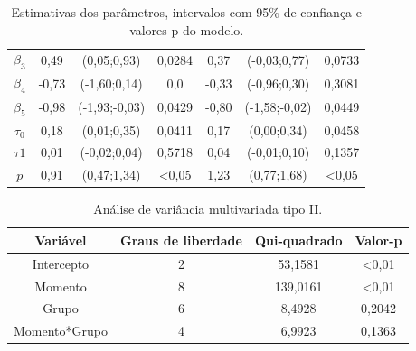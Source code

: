 \documentclass[AMA,STIX1COL]{WileyNJD-v2}
\begin{document}
\begin{table}[H]
\begin{tabular}{c|cccccc}
$\beta_3$                  & 0,49       & (0,05;0,93)                                                       & \multicolumn{1}{c|}{0,0284} & 0,37       & (-0,03;0,77)                                                      & 0,0733           \\
$\beta_4$                  & -0,73      & (-1,60;0,14)                                                      & \multicolumn{1}{c|}{0,0}            & -0,33      & (-0,96;0,30)                                                      & 0,3081           \\
$\beta_5$                  & -0,98      & (-1,93;-0,03)                                                     & \multicolumn{1}{c|}{0,0429} & -0,80      & (-1,58;-0,02)                                                     & 0,0449 \\
$\tau_0$                   & 0,18       & (0,01;0,35)                                                       & \multicolumn{1}{c|}{0,0411} & 0,17       & (0,00;0,34)                                                       & 0,0458           \\
$\tau1$                    & 0,01       & (-0,02;0,04)                                                      & \multicolumn{1}{c|}{0,5718}           & 0,04       & (-0,01;0,10)                                                      & 0,1357           \\
$p$                        & 0,91       & (0,47;1,34)                                                       & \multicolumn{1}{c|}{\textless 0,05} & 1,23       & (0,77;1,68)                                                       & \textless 0,05 \\ \hline
\end{tabular}
\caption{Estimativas dos parâmetros, intervalos com 95\% de confiança e valores-p do modelo.}
\label{tab3}
\end{table}

\begin{table}[H]
\centering
\begin{tabular}{cccc}
\hline
Variável      & Graus de liberdade & Qui-quadrado & Valor-p        \\ \hline
Intercepto    & 2                  & 53,1581      & \textless 0,01 \\
Momento       & 8                  & 139,0161     & \textless 0,01 \\
Grupo         & 6                  & 8,4928       & 0,2042         \\
Momento*Grupo & 4                  & 6,9923       & 0,1363         \\ \hline
\end{tabular}
\caption{Análise de variância multivariada tipo II.}
\label{tab4}
\end{table}
\end{document}

